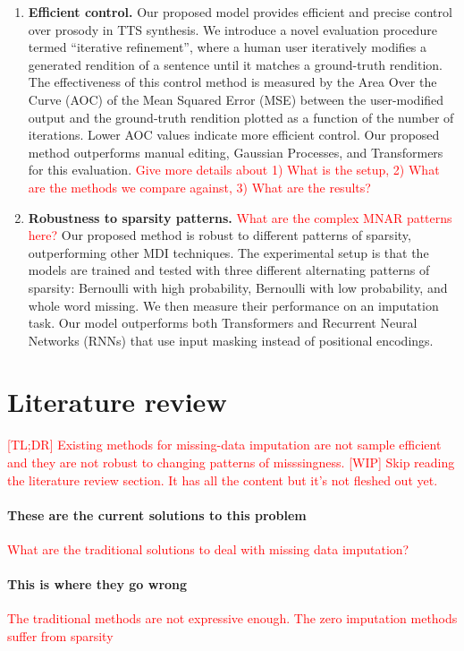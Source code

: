 \documentclass[a4paper,12pt,twoside,openright]{report}
\newcommand{\crit}[1]{\textcolor{red}{#1}}
\begin{document}
\begin{enumerate}
    \item \textbf{Efficient control.} Our proposed model provides efficient and precise control over prosody in TTS synthesis. We introduce a novel evaluation procedure termed ``iterative refinement'', where a human user iteratively modifies a generated rendition of a sentence until it matches a ground-truth rendition. The effectiveness of this control method is measured by the Area Over the Curve (AOC) of the Mean Squared Error (MSE) between the user-modified output and the ground-truth rendition plotted as a function of the number of iterations. Lower AOC values indicate more efficient control. Our proposed method outperforms manual editing, Gaussian Processes, and Transformers for this evaluation. \crit{Give more details about 1) What is the setup, 2) What are the methods we compare against, 3) What are the results?}
    \item \textbf{Robustness to sparsity patterns.} \crit{What are the complex MNAR patterns here?} Our proposed method is robust to different patterns of sparsity, outperforming other MDI techniques. The experimental setup is that the models are trained and tested with three different alternating patterns of sparsity: Bernoulli with high probability, Bernoulli with low probability, and whole word missing. We then measure their performance on an imputation task. Our model outperforms both Transformers and Recurrent Neural Networks (RNNs) that use input masking instead of positional encodings.
\end{enumerate}

\section{Literature review}

\crit{[TL;DR] Existing methods for missing-data imputation are not sample efficient and they are not robust to changing patterns of misssingness. [WIP] Skip reading the literature review section. It has all the content but it's not fleshed out yet.}

\paragraph{These are the current solutions to this problem} \crit{What are the traditional solutions to deal with missing data imputation?}

\paragraph{This is where they go wrong} \crit{The traditional methods are not expressive enough. The zero imputation methods suffer from sparsity }
\end{document}
